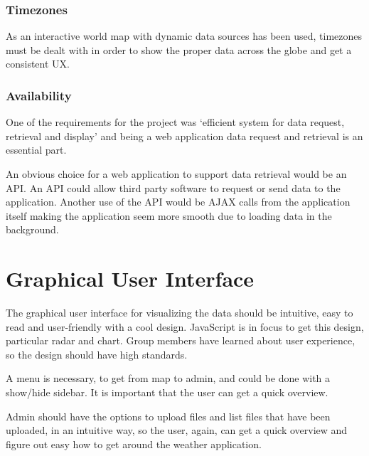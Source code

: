 \subsubsection{Timezones}
\label{sec:timezones}
As an interactive world map with dynamic data sources has been used, timezones must be dealt with in order to show the proper data across the globe and get a consistent UX.

\subsubsection{Availability}
\label{sec:availability}
One of the requirements for the project was `efficient system for data request, retrieval and display' and being a web application data request and retrieval is an essential part.

An obvious choice for a web application to support data retrieval would be an API. An API could allow third party software to request or send data to the application. Another use of the API would be AJAX calls from the application itself making the application seem more smooth due to loading data in the background.

\section{Graphical User Interface}
\label{sec:graphical_user_interface}
The graphical user interface for visualizing the data should be intuitive, easy to read and user-friendly with a cool design. JavaScript is in focus to get this design, particular radar and chart.
Group members have learned about user experience, so the design should have high standards.

A menu is necessary, to get from map to admin, and could be done with a show/hide sidebar. It is important that the user can get a quick overview.

Admin should have the options to upload files and list files that have been uploaded, in an intuitive way, so the user, again, can get a quick overview and figure out easy how to get around the weather application.